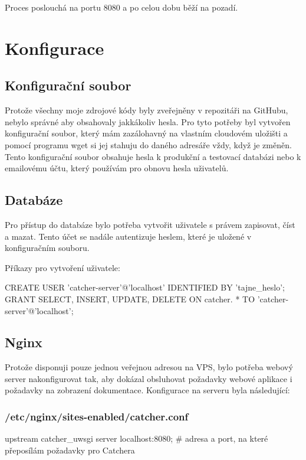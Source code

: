 Proces poslouchá na portu 8080 a po celou dobu běží na pozadí.

\section{Konfigurace}

\subsection{Konfigurační soubor}

Protože všechny moje zdrojové kódy byly zveřejněny v repozitáři na GitHubu, nebylo správné aby obsahovaly jakkákoliv hesla. Pro tyto potřeby byl vytvořen konfigurační soubor, který mám zazálohavný na vlastním cloudovém uložišti a pomocí programu wget si jej stahuju do daného adresáře vždy, když je změněn. Tento konfigurační soubor obsahuje hesla k produkční a testovací databázi nebo k emailovému účtu, který používám pro obnovu hesla uživatelů.

\subsection{Databáze}

Pro přístup do databáze bylo potřeba vytvořit uživatele s právem zapisovat, číst a mazat.
Tento účet se nadále autentizuje heslem, které je uložené v konfiguračním souboru.

Příkazy pro vytvoření uživatele:

CREATE USER 'catcher-server'@'localhost' IDENTIFIED BY 'tajne_heslo';
GRANT SELECT, INSERT, UPDATE, DELETE ON catcher. * TO 'catcher-server'@'localhost';

\subsection{Nginx}

Protože disponuji pouze jednou veřejnou adresou na VPS, bylo potřeba webový server nakonfigurovat tak, aby dokázal obsluhovat požadavky webové aplikace i požadavky
na zobrazení dokumentace. Konfigurace na serveru byla následující:

\subsubsection*{/etc/nginx/sites-enabled/catcher.conf}

upstream catcher_uwsgi {
    server localhost:8080;                                          # adresa a port, na které přeposílám požadavky pro Catchera
}

